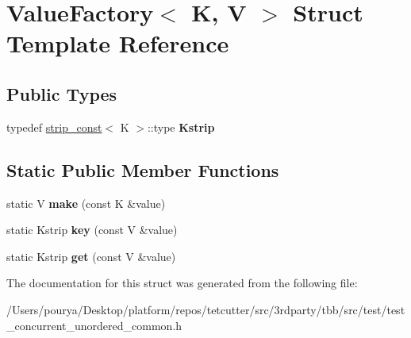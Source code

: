\hypertarget{structValueFactory}{}\section{Value\+Factory$<$ K, V $>$ Struct Template Reference}
\label{structValueFactory}
\subsection*{Public Types}
\begin{DoxyCompactItemize}
\item 
\hypertarget{structValueFactory_aeaac26eaec40f657a2dbae26689db0f2}{}typedef \hyperlink{structstrip__const}{strip\+\_\+const}$<$ K $>$\+::type {\bfseries Kstrip}\label{structValueFactory_aeaac26eaec40f657a2dbae26689db0f2}

\end{DoxyCompactItemize}
\subsection*{Static Public Member Functions}
\begin{DoxyCompactItemize}
\item 
\hypertarget{structValueFactory_a38029a7f9126a087de02309d3eefa092}{}static V {\bfseries make} (const K \&value)\label{structValueFactory_a38029a7f9126a087de02309d3eefa092}

\item 
\hypertarget{structValueFactory_af0c28bce611fed04f2ced70dfd84bb42}{}static Kstrip {\bfseries key} (const V \&value)\label{structValueFactory_af0c28bce611fed04f2ced70dfd84bb42}

\item 
\hypertarget{structValueFactory_aaeb7c98fa1631a30cbc665f5d2d34b97}{}static Kstrip {\bfseries get} (const V \&value)\label{structValueFactory_aaeb7c98fa1631a30cbc665f5d2d34b97}

\end{DoxyCompactItemize}


The documentation for this struct was generated from the following file\+:\begin{DoxyCompactItemize}
\item 
/\+Users/pourya/\+Desktop/platform/repos/tetcutter/src/3rdparty/tbb/src/test/test\+\_\+concurrent\+\_\+unordered\+\_\+common.\+h\end{DoxyCompactItemize}
